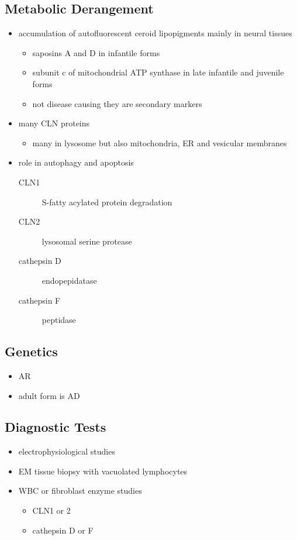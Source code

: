 \documentclass[12pt]{scrartcl}
\begin{document}
\subsection{Metabolic Derangement}
\label{sec:orgdb7536d}
\begin{itemize}
\item accumulation of autofluorescent ceroid lipopigments mainly in
neural tissues
\begin{itemize}
\item saposins A and D in infantile forms
\item subunit c of mitochondrial ATP synthase in late infantile and
juvenile forms
\item not disease causing they are secondary markers
\end{itemize}
\item many CLN proteins
\begin{itemize}
\item many in lysosome but also mitochondria, ER and vesicular membranes
\end{itemize}
\item role in autophagy and apoptosis
\begin{description}
\item[{CLN1}] S-fatty acylated protein degradation
\item[{CLN2}] lysosomal serine protease
\item[{cathepsin D}] endopepidatase
\item[{cathepsin F}] peptidase
\end{description}
\end{itemize}

\subsection{Genetics}
\label{sec:orge87ecba}
\begin{itemize}
\item AR
\item adult form is AD
\end{itemize}
\subsection{Diagnostic Tests}
\label{sec:orgda7b14d}
\begin{itemize}
\item electrophysiological studies
\item EM tissue biopsy with vacuolated lymphocytes
\item WBC or fibroblast enzyme studies
\begin{itemize}
\item CLN1 or 2
\item cathepsin D or F
\end{itemize}
\end{itemize}
\end{document}
